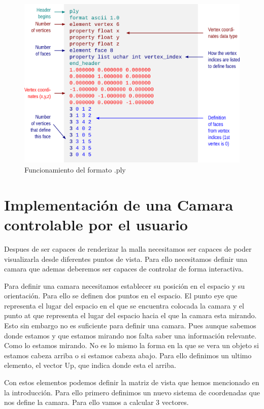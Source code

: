 \begin{figure}
\centering
\includegraphics{imagenes/format-ply.png}
\caption{Funcionamiento del formato .ply}

\end{figure}

\section{Implementación de una Camara controlable por el usuario}

Despues de ser capaces de renderizar la malla necesitamos ser capaces de poder visualizarla desde diferentes puntos de vista. Para ello necesitamos definir una camara que ademas deberemos ser capaces de controlar de forma interactiva.

Para definir una camara necesitamos establecer su posición en el espacio y su orientación. Para ello se definen dos puntos en el espacio. El punto eye que representa el lugar del espacio en el que se encuentra colocada la camara y el punto at que representa el lugar del espacio hacia el que la camara esta mirando.
Esto sin embargo no es suficiente para definir una camara. Pues aunque sabemos donde estamos y que estamos mirando nos falta saber una información relevante. Como lo estamos mirando. No es lo mismo la forma en la que se vera un objeto si estamos cabeza arriba o si estamos cabeza abajo. Para ello definimos un ultimo elemento,
el vector Up, que indica donde esta el arriba. 

Con estos elementos podemos definir la matriz de vista que hemos mencionado en la introducción. Para ello primero definimos un nuevo sistema de coordenadas que nos define la camara. Para ello vamos a calcular 3 vectores.

